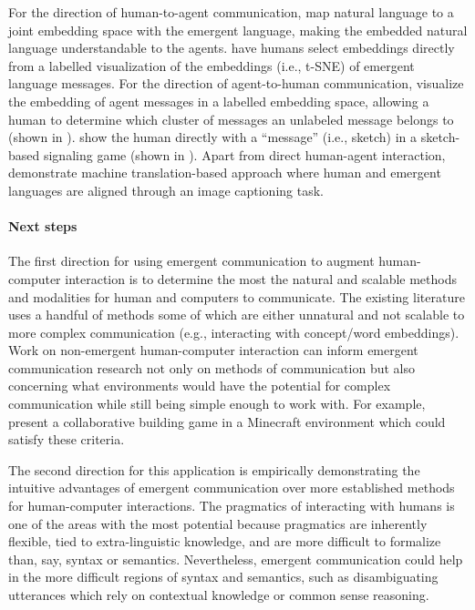 For the direction of human-to-agent communication, \citet{Tucker2021EmergentDC} map natural language to a joint embedding space with the emergent language, making the embedded natural language understandable to the agents.
\citet{Li2022LearningED} have humans select embeddings directly from a labelled visualization of the embeddings (i.e., t-SNE) of emergent language messages.
For the direction of agent-to-human communication, \citet{Tucker2021EmergentDC} visualize the embedding of agent messages in a labelled embedding space, allowing a human to determine which cluster of messages an unlabeled message belongs to (shown in ).
\citet{mihai2021learning} show the human directly with a ``message'' (i.e., sketch) in a sketch-based signaling game (shown in ).
Apart from direct human-agent interaction, \citet{Tucker2022GeneralizationAT} demonstrate machine translation-based approach where human and emergent languages are aligned through an image captioning task.

\paragraph{Next steps}
The first direction for using emergent communication to augment human-computer interaction is to determine the most the natural and scalable methods and modalities for human and computers to communicate.
The existing literature uses a handful of methods some of which are either unnatural and not scalable to more complex communication (e.g., interacting with concept/word embeddings).
Work on non-emergent human-computer interaction can inform emergent communication research not only on methods of communication but also concerning what environments would have the potential for complex communication while still being simple enough to work with.
For example, \citet{narayanchen2019collaborative} present a collaborative building game in a Minecraft environment which could satisfy these criteria.

The second direction for this application is empirically demonstrating the intuitive advantages of emergent communication over more established methods for human-computer interactions.
The pragmatics of interacting with humans is one of the areas with the most potential because pragmatics are inherently flexible, tied to extra-linguistic knowledge, and are more difficult to formalize than, say, syntax or semantics.
Nevertheless, emergent communication could help in the more difficult regions of syntax and semantics, such as disambiguating utterances which rely on contextual knowledge or common sense reasoning.



